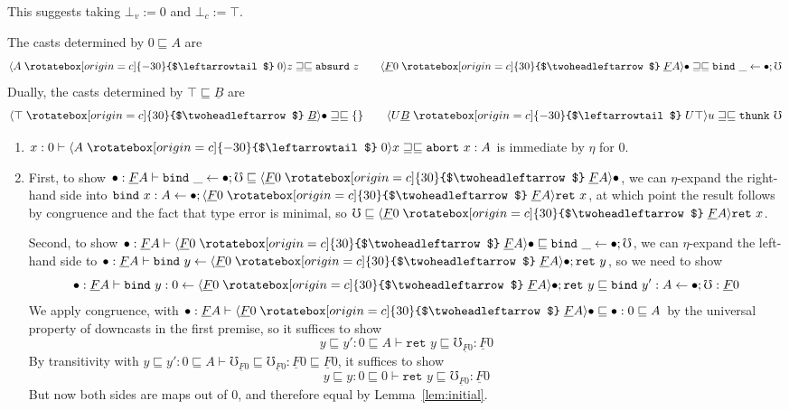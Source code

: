 \documentclass[acmsmall,screen,12pt]{acmart}
\renewcommand{\u}{\underline}
\newcommand{\ltdyn}{\sqsubseteq}
\newcommand{\gtdyn}{\sqsupseteq}
\newcommand{\equidyn}{\mathrel{\gtdyn\ltdyn}}
\newcommand{\uarrow}{\mathrel{\rotatebox[origin=c]{-30}{$\leftarrowtail$}}}
\newcommand{\darrow}{\mathrel{\rotatebox[origin=c]{30}{$\twoheadleftarrow$}}}
\newcommand{\upcast}[2]{\langle{#2}\uarrow{#1}\rangle}
\newcommand{\dncast}[2]{\langle{#1}\darrow{#2}\rangle}
\newcommand{\err}{\mho}
\newcommand{\bindXtoYinZ}[2]{\kw{bind}#2 \leftarrow #1;}
\newcommand{\kw}[1]{\texttt{#1}\,\,}
\newcommand{\absurd}{\kw{absurd}}
\newcommand{\ret}{\kw{ret}}
\newcommand{\thunk}{\kw{thunk}}
\newcommand{\abort}{\kw {abort}}
\begin{document}
\begin{longonly}
\begin{longonly}
This suggests taking $\bot_v := 0$ and $\bot_c := \top$.
\end{longonly}

\begin{theorem}
The casts determined by $0 \ltdyn A$ are
\[
\upcast{0}{A}z \equidyn \absurd z \qquad \dncast{\u F 0}{\u F A}{\bullet} \equidyn \bindXtoYinZ{\bullet}{\_}{\err}
\]
Dually, the casts determined by $\top \ltdyn \u B$ are
\[
\dncast{\top}{\u B}{\bullet} \equidyn \{\} \qquad \upcast{U \top}{U \u B}{u} \equidyn \thunk \err
\]
\end{theorem}

\begin{longproof}
  \begin{enumerate}
  \item $x : 0 \vdash \upcast{0}{A}{x} \equidyn \abort{x} : A$ is
    immediate by $\eta$ for $0$.

  \item First, to show
    $\bullet : \u F A \vdash \bindXtoYinZ{\bullet}{\_}{\err} \ltdyn \dncast{\u F 0}{\u F A}{\bullet}$,
    we can $\eta$-expand the right-hand side into
    $\bindXtoYinZ{\bullet}{x:A}{\dncast{\u F 0}{\u F A}{\ret{x}}}$,
    at which point the result follows by congruence
    and the fact that type error is minimal, so
    $\err \ltdyn {\dncast{\u F 0}{\u F A}{\ret{x}}}$.  

    Second, to show
    $\bullet : \u F A \vdash \dncast{\u F 0}{\u F A}{\bullet} \ltdyn \bindXtoYinZ{\bullet}{\_}{\err}$,
    we can $\eta$-expand the left-hand side to
    $\bullet : \u F A \vdash \bindXtoYinZ{\dncast{\u F 0}{\u F A}{\bullet}}{y}{\ret y}$,
    so we need to show
    \[
    \bullet: \u F A \vdash \bindXtoYinZ{\dncast{\u F 0}{\u F A}{\bullet}}{y:0}{\ret y} \ltdyn \bindXtoYinZ{\bullet}{y':A}{\err} : \u F 0
    \]
    We apply congruence, with $\bullet : \u F A \vdash {\dncast{\u F
        0}{\u F A}{\bullet}} \ltdyn \bullet : 0 \ltdyn A$ by the
    universal property of downcasts in the first premise, so it suffices
    to show
    \[
    y \ltdyn y' : 0 \ltdyn A \vdash \ret{y} \ltdyn \err_{\u F 0} : \u F 0
    \]
    By transitivity with $y \ltdyn y' : 0 \ltdyn A \vdash \err_{\u F 0}
    \ltdyn \err_{\u F 0} : \u F 0 \ltdyn \u F 0$, it suffices to show
    \[
    y \ltdyn y : 0 \ltdyn 0 \vdash \ret{y} \ltdyn \err_{\u F 0} : \u F 0
    \]
    But now both sides are maps out of $0$, and therefore equal by
    Lemma~\ref{lem:initial}.


\end{enumerate}
\end{longproof}
\end{longonly}
\end{document}
